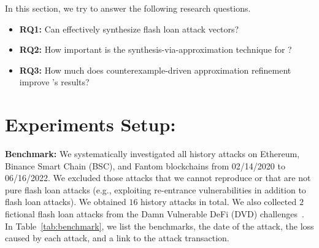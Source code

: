 In this section, we try to answer the following research questions. 
\begin{itemize}

\item \textbf{RQ1:} Can {\name} effectively synthesize flash loan attack vectors?

\item \textbf{RQ2:} How important is the synthesis-via-approximation technique for {\name}?

\item \textbf{RQ3:} How much does counterexample-driven approximation
    refinement improve {\name}'s results?
\end{itemize}



\section{Experiments Setup:}
\noindent \textbf{Benchmark:} 
We systematically investigated all history attacks on Ethereum, Binance Smart
Chain (BSC), and Fantom blockchains from 02/14/2020 to 06/16/2022. We excluded those attacks that we cannot reproduce or that are not pure flash loan attacks (e.g.,
exploiting re-entrance vulnerabilities in addition to flash loan attacks). We
obtained $16$ history attacks in total. We also collected $2$ fictional flash
loan attacks from the Damn Vulnerable DeFi (DVD) challenges~\cite{DVD}. In
Table~\ref{tab:benchmark}, we list the benchmarks, the date of the attack, the
loss caused by each attack, and a link to the attack transaction. 




